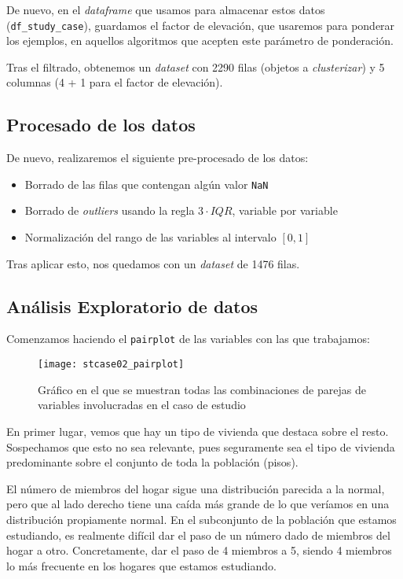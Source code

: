 \documentclass[11pt]{article}
\begin{document}
De nuevo, en el \emph{dataframe} que usamos para almacenar estos datos (\lstinline{df_study_case}), guardamos el factor de elevación, que usaremos para ponderar los ejemplos, en aquellos algoritmos que acepten este parámetro de ponderación.

Tras el filtrado, obtenemos un \emph{dataset} con 2290 filas (objetos a \emph{clusterizar}) y 5 columnas (4 + 1 para el factor de elevación).

\pagebreak

\subsection{Procesado de los datos}

De nuevo, realizaremos el siguiente pre-procesado de los datos:

\begin{itemize}
    \item Borrado de las filas que contengan algún valor \lstinline{NaN}
    \item Borrado de \emph{outliers} usando la regla $3 \cdot IQR$, variable por variable
    \item Normalización del rango de las variables al intervalo $[0, 1]$
\end{itemize}

Tras aplicar esto, nos quedamos con un \emph{dataset} de 1476 filas.

\pagebreak

\subsection{Análisis Exploratorio de datos}

Comenzamos haciendo el \lstinline{pairplot} de las variables con las que trabajamos:

\begin{figure}[H]
    \centering

    \texttt{[image: stcase02\_pairplot]}
    \caption{Gráfico en el que se muestran todas las combinaciones de parejas de variables involucradas en el caso de estudio}
    \label{stcase01_pairplot:figura}
\end{figure}

En primer lugar, vemos que hay un tipo de vivienda que destaca sobre el resto. Sospechamos que esto no sea relevante, pues seguramente sea el tipo de vivienda predominante sobre el conjunto de toda la población (pisos).

El número de miembros del hogar sigue una distribución parecida a la normal, pero que al lado derecho tiene una caída más grande de lo que veríamos en una distribución propiamente normal. En el subconjunto de la población que estamos estudiando, es realmente difícil dar el paso de un número dado de miembros del hogar a otro. Concretamente, dar el paso de 4 miembros a 5, siendo 4 miembros lo más frecuente en los hogares que estamos estudiando.
\end{document}
